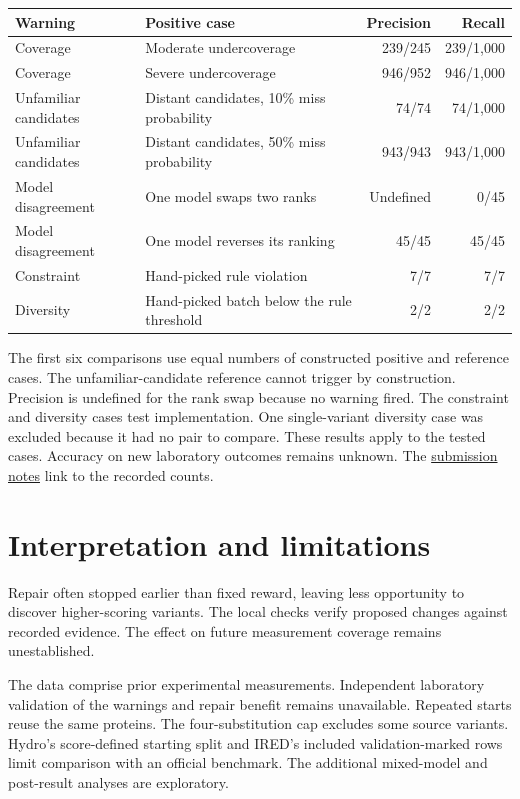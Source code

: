 \documentclass[11pt,a4paper]{article}
\begin{document}
\begin{center}
\begin{tabular}{@{}p{3.6cm}p{5.7cm}rr@{}}
\toprule
Warning & Positive case & Precision & Recall \\
\midrule
Coverage & Moderate undercoverage & 239/245 & 239/1,000 \\
Coverage & Severe undercoverage & 946/952 & 946/1,000 \\
Unfamiliar candidates & Distant candidates, 10\% miss probability & 74/74 & 74/1,000 \\
Unfamiliar candidates & Distant candidates, 50\% miss probability & 943/943 & 943/1,000 \\
Model disagreement & One model swaps two ranks & Undefined & 0/45 \\
Model disagreement & One model reverses its ranking & 45/45 & 45/45 \\
Constraint & Hand-picked rule violation & 7/7 & 7/7 \\
Diversity & Hand-picked batch below the rule threshold & 2/2 & 2/2 \\
\bottomrule
\end{tabular}
\end{center}
The first six comparisons use equal numbers of constructed positive and reference cases. The unfamiliar-candidate reference cannot trigger by construction. Precision is undefined for the rank swap because no warning fired. The constraint and diversity cases test implementation. One single-variant diversity case was excluded because it had no pair to compare. These results apply to the tested cases. Accuracy on new laboratory outcomes remains unknown. The \href{../docs/overview/submission_readiness.md}{submission notes} link to the recorded counts.

\section{Interpretation and limitations}
Repair often stopped earlier than fixed reward, leaving less opportunity to discover higher-scoring variants. The local checks verify proposed changes against recorded evidence. The effect on future measurement coverage remains unestablished.

The data comprise prior experimental measurements. Independent laboratory validation of the warnings and repair benefit remains unavailable. Repeated starts reuse the same proteins. The four-substitution cap excludes some source variants. Hydro's score-defined starting split and IRED's included validation-marked rows limit comparison with an official benchmark. The additional mixed-model and post-result analyses are exploratory.
\end{document}
